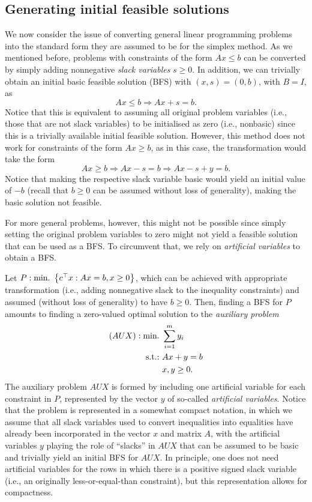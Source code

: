 \subsection{Generating initial feasible solutions} 

We now consider the issue of converting general linear programming problems into the standard form they are assumed to be for the simplex method. As we mentioned before, problems with constraints of the form $Ax \le b$ can be converted by simply adding nonnegative \emph{slack variables} $s \geq 0$. In addition, we can trivially obtain an initial basic feasible solution (BFS) with $(x,s) = (0,b)$, with $B = I$, as
%
\begin{equation*}
		Ax \leq b \Rightarrow Ax + s = b.
\end{equation*}
%
Notice that this is equivalent to assuming all original problem variables (i.e., those that are not slack variables) to be initialised as zero (i.e., nonbasic) since this is a trivially available initial feasible solution. However, this method does not work for constraints of the form $Ax \ge b$, as in this case, the transformation would take the form 
%
\begin{equation*}
	Ax \geq b \Rightarrow Ax - s = b \Rightarrow Ax - s + y = b.	
\end{equation*}
%
Notice that making the respective slack variable basic would yield an initial value of $-b$ (recall that $b \ge 0$ can be assumed without loss of generality), making the basic solution not feasible.

For more general problems, however, this might not be possible since simply setting the original problem variables to zero might not yield a feasible solution that can be used as a BFS. To circumvent that, we rely on \emph{artificial variables} to obtain a BFS.

Let $P : \mathop{\text{min.~}}\left\{ c^\top x : Ax = b, x \geq 0 \right \}$, which can be achieved with appropriate transformation (i.e., adding nonnegative slack to the inequality constraints) and assumed (without loss of generality) to have $b \geq 0$. Then, finding a BFS for $P$ amounts to finding a zero-valued optimal solution to the \emph{auxiliary problem}
%
\begin{align*}
	(AUX) : \mathop{\text{min.~}} &\sum_{i=1}^m y_i \\
	\mathop{\text{s.t.:~}} & Ax + y = b \\
	    & x,y \geq 0.	
\end{align*}
%
The auxiliary problem $AUX$ is formed by including one artificial variable for each constraint in $P$, represented by the vector $y$ of so-called \emph{artificial variables}. Notice that the problem is represented in a somewhat compact notation, in which we assume that all slack variables used to convert inequalities into equalities have already been incorporated in the vector $x$ and matrix $A$, with the artificial variables $y$ playing the role of ``slacks'' in $AUX$ that can be assumed to be basic and trivially yield an initial BFS for $AUX$. In principle, one does not need artificial variables for the rows in which there is a positive signed slack variable (i.e., an originally less-or-equal-than constraint), but this representation allows for compactness. 

